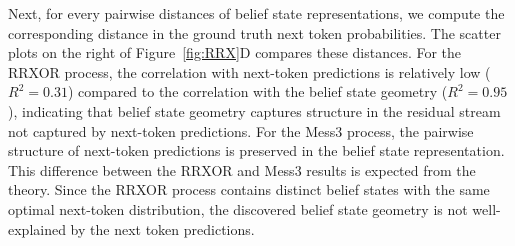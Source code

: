\documentclass{article}
\begin{document}
Next, for every pairwise distances of belief state representations, we compute the corresponding distance in the ground truth next token probabilities. The scatter plots on the right of Figure~\ref{fig:RRX}D compares these distances. For the RRXOR process, the correlation with next-token predictions is relatively low ($R^2 = 0.31$) compared to the correlation with the belief state geometry ($R^2 = 0.95$), indicating that belief state geometry captures structure in the residual stream not captured by next-token predictions. For the Mess3 process, the pairwise structure of next-token predictions is preserved in the belief state representation. This difference between the RRXOR and Mess3 results is expected from the theory. Since the RRXOR process contains distinct belief states with the same optimal next-token distribution, the discovered belief state geometry is not well-explained by the next token predictions.


\end{document}
